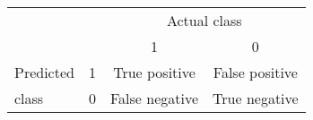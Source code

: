 \documentclass{article}
\begin{document}
\begin{tabular}{ lccc }
\multicolumn{1}{r}{} 
 & & \multicolumn{2}{c}{Actual class}\\
\multicolumn{1}{r}{}
 & & \multicolumn{1}{c}{1} & \multicolumn{1}{c}{0} \\
\cline{3-4}
Predicted & 1 & \multicolumn{1}{|c|}{True positive} & \multicolumn{1}{|c|}{False positive} \\
\cline{3-4}
class & 0 & \multicolumn{1}{|c|}{False negative} & \multicolumn{1}{|c|}{True negative} \\
\cline{3-4}
\end{tabular}
\end{document}
